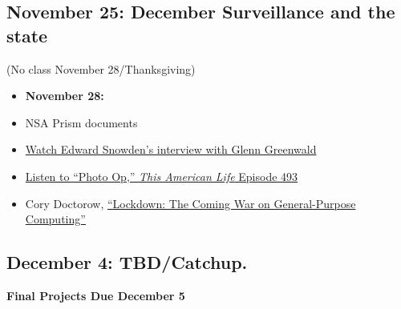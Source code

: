 \subsection{November 25: December Surveillance and the
state}\label{november-25-december-surveillance-and-the-state}

(No class November 28/Thanksgiving)

\begin{itemize}
\itemsep1pt\parskip0pt
\item
  \textbf{November 28:}
  \cite[Networked Authoritarianism]{mackinnon_consent_2012}
\item
  NSA Prism documents
\item
  \href{http://www.youtube.com/watch?v=5yB3n9fu-rM}{Watch Edward
  Snowden's interview with Glenn Greenwald}
\item
  \href{http://www.thisamericanlife.org/radio-archives/episode/493/picture-show?act=1}{Listen
  to ``Photo Op,'' \emph{This American Life} Episode 493}
\item
  Cory Doctorow,
  \href{http://boingboing.net/2012/01/10/lockdown.html}{``Lockdown: The
  Coming War on General-Purpose Computing''}
\end{itemize}

\subsection{December 4: TBD/Catchup.}\label{december-4-tbdcatchup.}

\textbf{Final Projects Due December 5}

